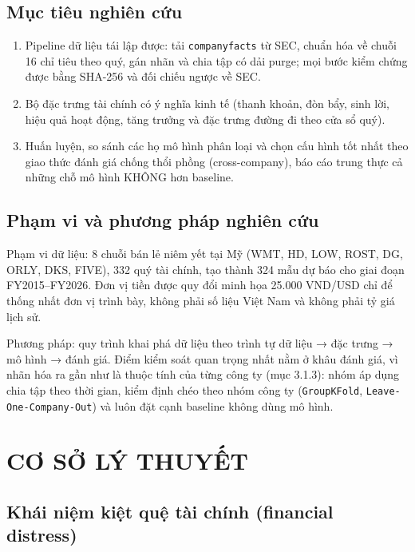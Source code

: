 \documentclass[13pt,a4paper]{extreport}
\begin{document}
\section{Mục tiêu nghiên cứu}

\begin{enumerate}
\item Pipeline dữ liệu tái lập được: tải \texttt{companyfacts} từ SEC, chuẩn hóa về chuỗi 16 chỉ tiêu theo quý, gán nhãn và chia tập có dải purge; mọi bước kiểm chứng được bằng SHA-256 và đối chiếu ngược về SEC.
\item Bộ đặc trưng tài chính có ý nghĩa kinh tế (thanh khoản, đòn bẩy, sinh lời, hiệu quả hoạt động, tăng trưởng và đặc trưng đường đi theo cửa sổ quý).
\item Huấn luyện, so sánh các họ mô hình phân loại và chọn cấu hình tốt nhất theo giao thức đánh giá chống thổi phồng (cross-company), báo cáo trung thực cả những chỗ mô hình KHÔNG hơn baseline.
\end{enumerate}

\section{Phạm vi và phương pháp nghiên cứu}

Phạm vi dữ liệu: 8 chuỗi bán lẻ niêm yết tại Mỹ (WMT, HD, LOW, ROST, DG, ORLY, DKS, FIVE), 332 quý tài chính, tạo thành 324 mẫu dự báo cho giai đoạn FY2015–FY2026. Đơn vị tiền được quy đổi minh họa 25.000 VND/USD chỉ để thống nhất đơn vị trình bày, không phải số liệu Việt Nam và không phải tỷ giá lịch sử.

Phương pháp: quy trình khai phá dữ liệu theo trình tự dữ liệu → đặc trưng → mô hình → đánh giá. Điểm kiểm soát quan trọng nhất nằm ở khâu đánh giá, vì nhãn hóa ra gần như là thuộc tính của từng công ty (mục 3.1.3): nhóm áp dụng chia tập theo thời gian, kiểm định chéo theo nhóm công ty (\texttt{GroupKFold}, \texttt{Leave-One-Company-Out}) và luôn đặt cạnh baseline không dùng mô hình.

\clearpage

\chapter{CƠ SỞ LÝ THUYẾT}

\section{Khái niệm kiệt quệ tài chính (financial distress)}
\end{document}
